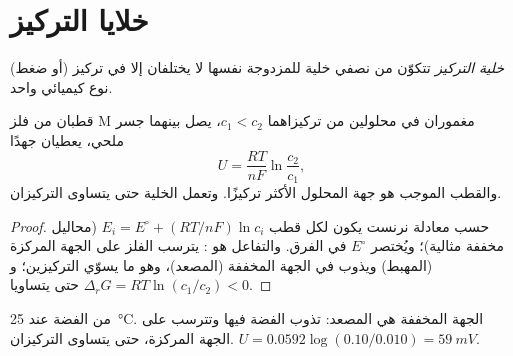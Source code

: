 \section{خلايا التركيز}

\begin{definition}\label{def:b2:cell-thermodynamics:concentration-cell}
\emph{خلية التركيز} تتكوّن من نصفي
خلية للمزدوجة نفسها لا يختلفان إلا في تركيز (أو
ضغط) نوع كيميائي واحد.
\end{definition}

\begin{proposition}\label{prop:b2:cell-thermodynamics:concentration-cell}
قطبان من فلز M مغموران في محلولين من  تركيزاهما
$c_1 < c_2$، يصل بينهما جسر ملحي، يعطيان جهدًا
\[
  U = \frac{RT}{nF}\ln\frac{c_2}{c_1} ,
\]
والقطب الموجب هو جهة المحلول الأكثر تركيزًا. وتعمل الخلية حتى يتساوى
التركيزان.
\end{proposition}

\begin{proof}
حسب معادلة نرنست يكون لكل قطب $E_i = E^\circ + (RT/nF)\ln c_i$ (محاليل
مخففة مثالية)؛ ويُختصر $E^\circ$ في الفرق. والتفاعل هو
: يترسب الفلز على
الجهة المركزة (المهبط) ويذوب في الجهة المخففة (المصعد)، وهو ما
يسوّي التركيزين؛ و$\Delta_r G = RT\ln(c_1/c_2) < 0$ حتى
يتساويا.
\end{proof}

\begin{omfigure}

{\small {} من الفضة عند \qty{25}{\degreeCelsius}. الجهة المخففة هي
المصعد: تذوب الفضة فيها وتترسب على الجهة المركزة،
حتى يتساوى التركيزان. $U = 0.0592\log(0.10/0.010) =
\qty{59}{mV}$.}
\end{omfigure}

